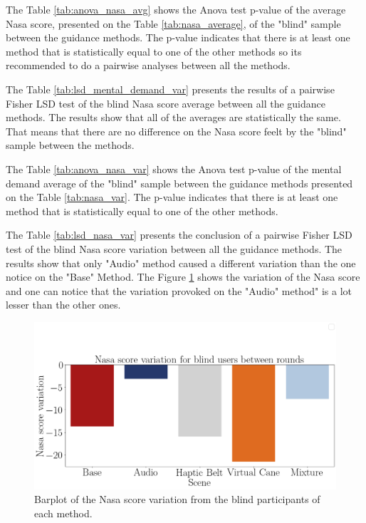 

The Table \ref{tab:anova_nasa_avg} shows the Anova test p-value of the average Nasa score, presented on the Table \ref{tab:nasa_average}, of the "blind" sample between the guidance methods. The p-value indicates that there is at least one method that is statistically equal to one of the other methods so its recommended to do a pairwise analyses between all the methods.



The Table \ref{tab:lsd_mental_demand_var} presents the results of a pairwise Fisher LSD test of the blind Nasa score average between all the guidance methods. The results show that all of the averages are statistically the same. That means that there are no difference on the Nasa score feelt by the "blind" sample between the methods.



The Table \ref{tab:anova_nasa_var} shows the Anova test p-value of the mental demand average of the "blind" sample between the guidance methods presented on the Table \ref{tab:nasa_var}. The p-value indicates that there is at least one method that is statistically equal to one of the other methods.





The Table \ref{tab:lsd_nasa_var} presents the conclusion of a pairwise Fisher LSD test of the blind Nasa score variation between all the guidance methods. The results show that only "Audio" method caused a different variation than the one notice on the "Base" Method. The Figure \ref{fig:barplot_nasa_var_scene_blind} shows the variation of the Nasa score and one can notice that the variation provoked on the "Audio" method" is a lot lesser than the other ones.





\begin{figure}[!htb]
    \centering
    \includegraphics[width = 0.8\linewidth]{Resultados/Nasa/Figuras/png/barplot_nasa_var_scene_blind.png}
    \caption{Barplot of the Nasa score variation from the blind participants of each method.}
    \label{fig:barplot_nasa_var_scene_blind}
\end{figure}

